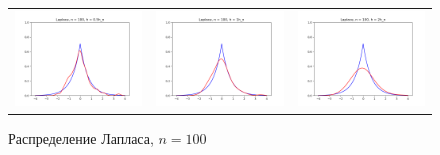 	\begin{figure}[H]
		\centering
		\begin{tabular}{ccc}
			\includegraphics[width=55mm, height =0.25\textheight]{pics/ker_l_100_1.png}
			&
			\includegraphics[width=55mm, height =0.25\textheight]{pics/ker_l_100_2.png}
			&
			\includegraphics[width=55mm, height =0.25\textheight]{pics/ker_l_100_3.png}
		\end{tabular}
		\caption{Распределение Лапласа, $n = 100$}
		\label{fig:laplace}
	\end{figure}
	
